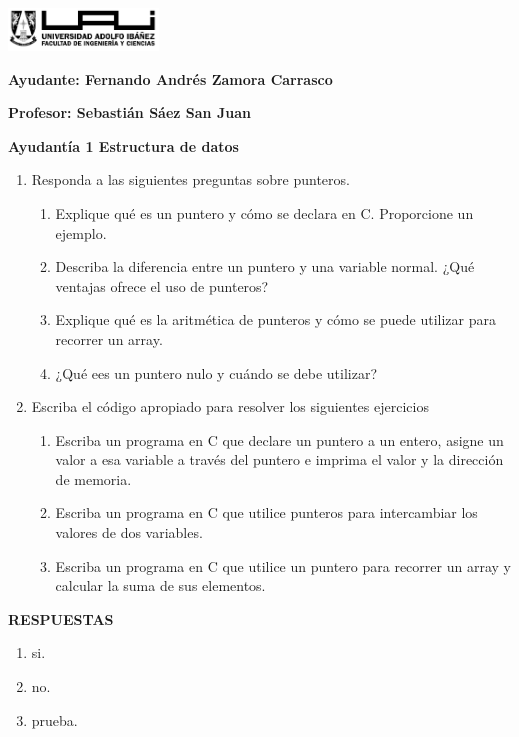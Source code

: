 \documentclass[12pt]{article}
\begin{document}
\begin{titlepage}
    \centering
    \includegraphics[width=0.3\textwidth]{../imgs/logo-uai-fic.png}

    \vspace{2cm}
    \textbf{\fontsize{12}{24}\selectfont Ayudante: Fernando Andrés Zamora Carrasco}

    \vspace{-1.2cm}
    \textbf{\fontsize{12}{24}\selectfont Profesor: Sebastián Sáez San Juan}

    \vspace{-1.3cm}
    \textbf{\fontsize{12}{24} Ayudantía 1 Estructura de datos}

    \vspace{2cm}


\begin{enumerate}
    \item Responda a las siguientes preguntas sobre punteros.
        \begin{enumerate}[label=\alph*)]
            \item Explique qué es un puntero y cómo se declara en C. Proporcione un ejemplo.
            \item Describa la diferencia entre un puntero y una variable normal. 
            ¿Qué ventajas ofrece el uso de punteros?
            \item Explique qué es la aritmética de punteros y cómo se puede utilizar para recorrer un array.
            \item ¿Qué ees un puntero nulo y cuándo se debe utilizar? 
        \end{enumerate}

    \item Escriba el código apropiado para resolver los siguientes ejercicios
        \begin{enumerate}[label=\alph*)]
            \item Escriba un programa en C que declare un puntero a un entero, asigne un valor a esa variable a través del puntero e imprima el valor y la dirección de memoria.
            \item Escriba un programa en C que utilice punteros para intercambiar los valores de dos variables.
            \item Escriba un programa en C que utilice un puntero para recorrer un array y calcular la suma de sus elementos.
        \end{enumerate}
\end{enumerate}
\end{titlepage}

\newpage
\begin{center}
    \textbf{RESPUESTAS}
\end{center}

\begin{enumerate}
    \item si.
    \item no.
    \item prueba.
\end{enumerate}
\end{document}
